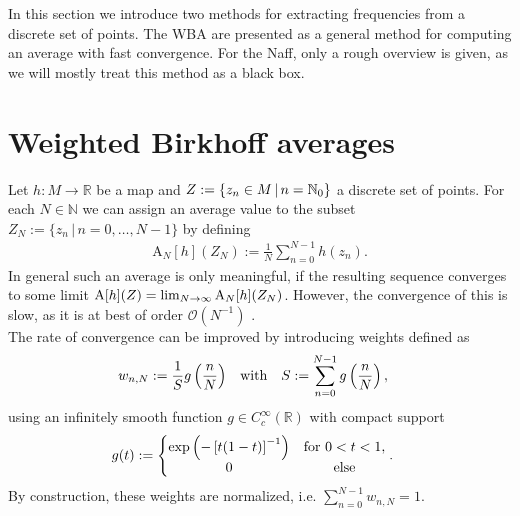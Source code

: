In this section we introduce two methods for extracting frequencies from a discrete set of points.
The WBA are presented as a general method for computing an average with fast convergence.
For the Naff, only a rough overview is given, as we will mostly treat this method as a black box.
\section{Weighted Birkhoff averages}
Let $h:M\rightarrow\mathbb{R}$ be a map and $Z:=\left\{{z_n\in M\,\vert\,n=\mathbb{N}_0} \right\}$ a discrete set of points. 
For each $N\in\mathbb{N}$ we can assign an average value to the subset $Z_N:=\{z_n\,\vert\,n=0,\dots,N-1\}$ by defining
\begin{align}
\text{A}_N[h](Z_N):=\frac{1}{N}\sum_{n=0}^{N-1}h(z_n). \label{eqn:NormalAverage}
\end{align}
In general such an average is only meaningful, if the resulting sequence converges to some limit $\text{A}[h](Z)=\lim_{N\rightarrow\infty}\text{A}_N[h](Z_N)$. 
However, the convergence of this is slow, as it is at best of order $\mathcal{O}(N^{-1})$ \cite{SanMei2020}. 
\\%
The rate of convergence can be improved by introducing weights defined as
\begin{align}
w_{n,N}&:=\frac{1}{S}g\left( {\frac{n}{N}} \right)&\text{with}&&S&:=\sum_{n=0}^{N-1}g\left( {\frac{n}{N}} \right),
\end{align} 
using an infinitely smooth function $g\in C^\infty_c (\mathbb{R})$ with compact support
\begin{align}
g(t)&:=\left\{\begin{matrix}
\exp\left( {-\left[ {t(1-t)} \right]^{-1}} \right)&\text{for}\ 0<t<1,\\
0&\text{else}
\end{matrix}\right. .
\end{align}
By construction, these weights are normalized, i.e. $\sum_{n=0}^{N-1}w_{n,N}=1$. \\
